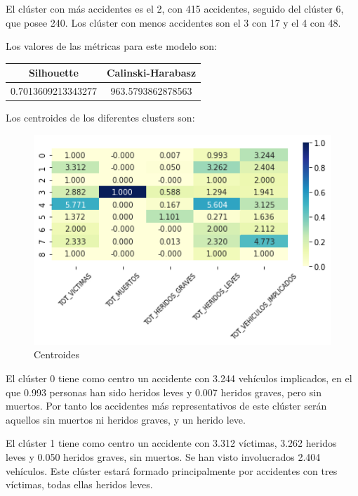 \documentclass[a4]{article}
\begin{document}
El clúster con más accidentes es el 2, con 415 accidentes, seguido del clúster 6, que posee 240. Los clúster con menos accidentes son el 3 con 17 y el 4 con 48.

Los valores de las métricas para este modelo son:

\begin{center}
\begin{tabular}{|c|c|}
\hline
\multicolumn{1}{|c|}{\textbf{Silhouette}} & \textbf{Calinski-Harabasz}\\ \hline
  0.7013609213343277 & 963.5793862878563 \\ \hline
\end{tabular}
\end{center}

Los centroides de los diferentes clusters son:

\begin{figure}[H]
  \centering
  \caption{Centroides}
  \includegraphics[width=130mm]{imagenes/c2_kmeans_centroides}
\end{figure}

El clúster 0 tiene como centro un accidente con 3.244 vehículos implicados, en el que 0.993 personas han sido heridos leves y 0.007 heridos graves, pero sin muertos. Por tanto los accidentes más representativos de este clúster serán aquellos sin muertos ni heridos graves, y un herido leve.

El clúster 1 tiene como centro un accidente con 3.312 víctimas, 3.262 heridos leves y 0.050 heridos graves, sin muertos. Se han visto involucrados 2.404 vehículos. Este clúster estará formado principalmente por accidentes con tres víctimas, todas ellas heridos leves.
\end{document}
